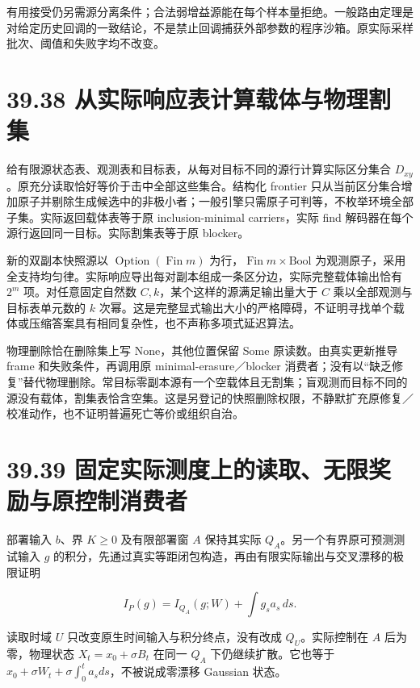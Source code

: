 \documentclass[
  11pt,
  oneside]{book}
\begin{document}
有用接受仍另需源分离条件；合法弱增益源能在每个样本量拒绝。一般路由定理是对给定历史回调的一致结论，不是禁止回调捕获外部参数的程序沙箱。原实际采样批次、阈值和失败字均不改变。

\section{39.38 从实际响应表计算载体与物理割集}\label{ux4eceux5b9eux9645ux54cdux5e94ux8868ux8ba1ux7b97ux8f7dux4f53ux4e0eux7269ux7406ux5272ux96c6}

给有限源状态表、观测表和目标表，从每对目标不同的源行计算实际区分集合 \(D_{xy}\)。原充分读取恰好等价于击中全部这些集合。结构化 frontier 只从当前区分集合增加原子并剔除生成候选中的非极小者；一般引擎只需原子可判等，不枚举环境全部子集。实际返回载体表等于原 inclusion-minimal carriers，实际 find 解码器在每个源行返回同一目标。实际割集表等于原 blocker。

新的双副本快照源以 \(\operatorname{Option}(\operatorname{Fin}m)\) 为行，\(\operatorname{Fin}m\times\mathrm{Bool}\) 为观测原子，采用全支持均匀律。实际响应导出每对副本组成一条区分边，实际完整载体输出恰有 \(2^m\) 项。对任意固定自然数 \(C,k\)，某个这样的源满足输出量大于 \(C\) 乘以全部观测与目标表单元数的 \(k\) 次幂。这是完整显式输出大小的严格障碍，不证明寻找单个载体或压缩答案具有相同复杂性，也不声称多项式延迟算法。

物理删除恰在删除集上写 None，其他位置保留 Some 原读数。由真实更新推导 frame 和失败条件，再调用原 minimal-erasure／blocker 消费者；没有以``缺乏修复''替代物理删除。常目标零副本源有一个空载体且无割集；盲观测而目标不同的源没有载体，割集表恰含空集。这是另登记的快照删除权限，不静默扩充原修复／校准动作，也不证明普遍死亡等价或组织自治。

\section{39.39 固定实际测度上的读取、无限奖励与原控制消费者}\label{ux56faux5b9aux5b9eux9645ux6d4bux5ea6ux4e0aux7684ux8bfbux53d6ux65e0ux9650ux5956ux52b1ux4e0eux539fux63a7ux5236ux6d88ux8d39ux8005}

部署输入 \(b\)、界 \(K\ge0\) 及有限部署窗 \(A\) 保持其实际 \(Q_A\)。另一个有界原可预测测试输入 \(g\) 的积分，先通过真实等距闭包构造，再由有限实际输出与交叉漂移的极限证明

\[I_P(g)=I_{Q_A}(g;W)+\int g_s a_s\,ds.\]

读取时域 \(U\) 只改变原生时间输入与积分终点，没有改成 \(Q_U\)。实际控制在 \(A\) 后为零，物理状态 \(X_t=x_0+\sigma B_t\) 在同一 \(Q_A\) 下仍继续扩散。它也等于 \(x_0+\sigma W_t+\sigma\int_0^t a_sds\)，不被说成零漂移 Gaussian 状态。
\end{document}

